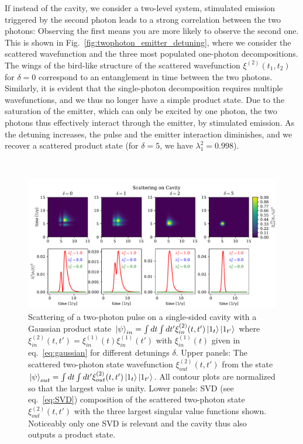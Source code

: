 If instead of the cavity, we consider a two-level system, stimulated emission triggered by the second photon leads to a strong correlation between the two photons: Observing the first means you are more likely to observe the second one. This is shown in Fig.~\ref{fig:twophoton_emitter_detuning}, where we consider the scattered wavefunction and the three most populated one-photon decompositions. The wings of the bird-like structure of the scattered wavefunction $\xi^{(2)}(t_1,t_2)$ for $\delta = 0$ correspond to an entanglement in time between the two photons. Similarly, it is evident that the single-photon decomposition requires multiple wavefunctions, and we thus no longer have a simple product state. Due to the saturation of the emitter, which can only be excited by one photon, the two photons thus effectively interact through the emitter, by stimulated emission. As the detuning increases, the pulse and the emitter interaction diminishes, and we recover a scattered product state (for $\delta = 5$, we have $\lambda_1^2 = 0.998$).

\

\begin{figure}
    \centering
    \includegraphics[width = 0.94\linewidth]{figures/twophoton_cavity_detuning.pdf}
    \caption{Scattering of a two-photon pulse on a single-sided cavity with a Gaussian product state $\ket{\psi}_{in} = \int dt \int dt' \xi_{in}^{(2)}(t,t') \ket{1_t}\ket{1_{t'}}$ where $ \xi_{in}^{(2)}(t,t') = \xi_{in}^{(1)}(t)\xi_{in}^{(1)}(t')$ with $\xi_{in}^{(1)}(t)$ given in eq.~\eqref{eq:gaussian} for different detunings $\delta$. Upper panels: The scattered two-photon state wavefunction $\xi_{out}^{(2)}(t,t')$ from the state $\ket{\psi}_{out} = \int dt \int dt' \xi_{out}^{(2)}(t,t') \ket{1_t}\ket{1_{t'}}$. All contour plots are normalized so that the largest value is unity. Lower panels: SVD (see eq.~\eqref{eq:SVD}) composition of the scattered two-photon state $\xi_{out}^{(2)}(t,t')$ with the three largest singular value functions shown. Noticeably only one SVD is relevant and the cavity thus also outputs a product state.} 
    \label{fig:twophoton_detuning}
\end{figure}



